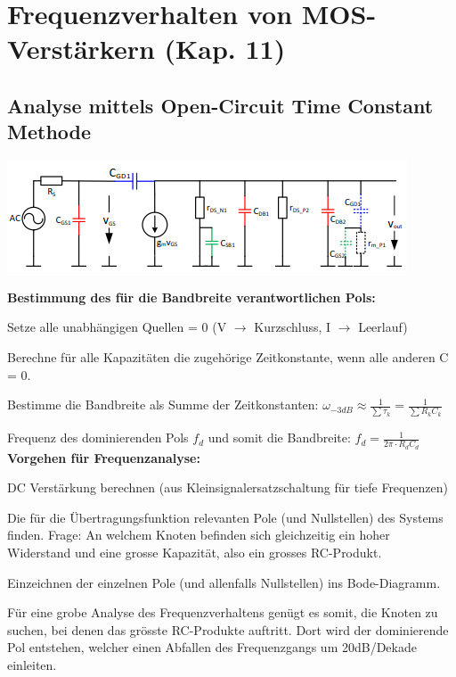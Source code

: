 
\section{Frequenzverhalten von MOS-Verstärkern (Kap. 11)}
\subsection{Analyse mittels Open-Circuit Time Constant Methode} 
\begin{minipage}[c]{0.5\textwidth}
	\includegraphics[width=1\linewidth]{chapters/Frequenzverhalten/images/parasitaere_kapazitaeten}
\end{minipage}
\begin{minipage}[c]{0.5\textwidth}
\textbf{Bestimmung des für die Bandbreite verantwortlichen Pols:}
\begin{compactenum}
	\item Setze alle unabhängigen Quellen = 0 (V $\rightarrow$ Kurzschluss, I $\rightarrow$ Leerlauf)
	\item Berechne für alle Kapazitäten die zugehörige Zeitkonstante, wenn alle anderen C = 0.
\end{compactenum}
\end{minipage}
\begin{compactenum}
	\setcounter{enumi}{2}
	\item Bestimme die Bandbreite als Summe der Zeitkonstanten: $\omega_{-3dB}\approx \frac{1}{\sum\tau_k}=\frac{1}{\sum R_kC_k}$
\end{compactenum}
Frequenz des dominierenden Pols $f_d$ und somit die Bandbreite: $f_d=\frac{1}{2\pi \cdot R_dC_d}$\\
\textbf{Vorgehen für Frequenzanalyse:}
\begin{compactenum}
	\item DC Verstärkung berechnen (aus Kleinsignalersatzschaltung für tiefe Frequenzen)
	\item Die für die Übertragungsfunktion relevanten Pole (und Nullstellen) des	Systems finden. Frage: An welchem Knoten befinden sich gleichzeitig ein hoher Widerstand und eine grosse Kapazität, also ein grosses RC-Produkt.
	\item Einzeichnen der einzelnen Pole (und allenfalls Nullstellen) ins Bode-Diagramm.
\end{compactenum}
Für eine grobe Analyse des Frequenzverhaltens genügt es somit, die Knoten zu suchen, bei denen das grösste RC-Produkte auftritt. Dort wird der dominierende Pol entstehen, welcher einen Abfallen des Frequenzgangs um 20dB/Dekade einleiten.

